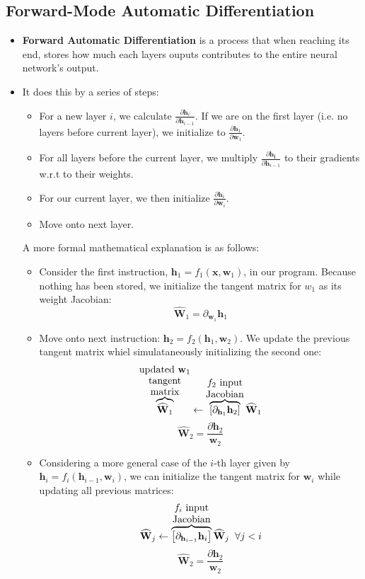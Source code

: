 \documentclass{article}
\newcommand{\tbf}[1]{\textbf{#1}}
\newcommand{\mbf}[1]{\mathbf{#1}}
\begin{document}
        \subsection{Forward-Mode Automatic Differentiation}
        \begin{itemize}
            \item \tbf{Forward Automatic Differentiation} is a process that when reaching its end, stores how much each layers ouputs contributes to the entire neural network's output.
            \item It does this by a series of steps:
            \begin{itemize}
                \item For a new layer $i$, we calculate $\frac{\partial \mbf{h}_i}{\partial \mbf{h}_{i-1}}$. If we are on the first layer (i.e. no layers before current layer), we initialize to $\frac{\partial \mbf{h}_1}{\partial \mbf{w}_1}$.
                \item For all layers before the current layer, we multiply $\frac{\partial \mbf{h_i}}{\partial \mbf{h}_{i-1}}$ to their gradients w.r.t to their weights.
                \item For our current layer, we then initialize $\frac{\partial \mbf{h}_i}{\partial \mbf{w}_i}$.
                \item Move onto next layer.
            \end{itemize}
            A more formal mathematical explanation is as follows:
            \begin{itemize}
                \item Consider the first instruction, $\mbf{h}_1 = f_1(\mbf{x}, \mbf{w}_1)$, in our program. Because nothing has been stored, we initialize the tangent matrix for $w_1$ as its weight Jacobian:
                \[\widehat{\mbf{W}}_1 = \partial _{\mbf{w}_1} \mbf{h}_1\]
                \item Move onto next instruction: $\mbf{h}_2 = f_2(\mbf{h}_1, \mbf{w}_2)$. We update the previous tangent matrix whiel simulataneously initializing the second one:
\[\overbrace{\widehat{\mathbf{W}}_1}^{\shortstack{updated $\mbf{w}_1$ \\ tangent \\ matrix}}
\leftarrow
\overbrace{\left[ \partial_{\mathbf{h}_1} \mathbf{h}_2 \right]}^{\shortstack{$f_2$ input \\ Jacobian}}
\widehat{\mathbf{W}}_1\]
\[\widehat{\mbf{W}}_2 = \frac{\partial \mbf{h}_2}{\mbf{w}_2}\]
                \item Considering a more general case of the $i$-th layer given by $\mbf{h}_i = f_i(\mbf{h}_{i-1}, \mbf{w}_i)$, we can initialize the tangent matrix for $\mbf{w}_i$ while updating all previous matrices:
\[\widehat{\mbf{W}}_j
\leftarrow
\overbrace{\left[ \partial_{\mathbf{h}_{i-1}} \mathbf{h}_i \right]}^{\shortstack{$f_i$ input \\ Jacobian}}
\widehat{\mathbf{W}}_j \hspace{2mm} \forall j < i\]
\[\widehat{\mbf{W}}_2 = \frac{\partial \mbf{h}_2}{\mbf{w}_2}\]



\end{itemize}
\end{itemize}
\end{document}
